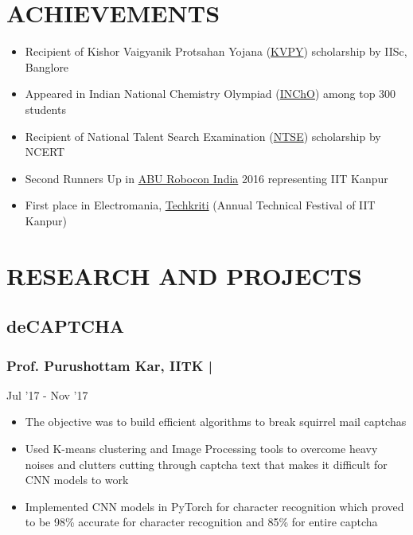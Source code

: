 \documentclass[letterpaper]{twentysecondcv} %
\begin{document}
\section{ACHIEVEMENTS}
\begin{itemize}
	\item Recipient of Kishor Vaigyanik Protsahan Yojana (\href{http://www.kvpy.iisc.ernet.in/main/index.htm}{KVPY}) scholarship by IISc, Banglore
	\item Appeared in Indian National Chemistry Olympiad (\href{http://chem.hbcse.tifr.res.in/in-india/}{INChO}) among top 300 students
	\item Recipient of National Talent Search Examination (\href{http://www.ncert.nic.in/programmes/talent_exam/index_talent.html}{NTSE}) scholarship by NCERT
	\item Second Runners Up in \href{http://www.roboconindia.com/}{ABU Robocon India} 2016 representing IIT Kanpur %
	\item First place in Electromania, \href{https://techkriti.org/}{Techkriti} (Annual Technical Festival of IIT Kanpur)
\end{itemize}
\section{RESEARCH AND PROJECTS}
\subsection{deCAPTCHA}\subsubsection{Prof. Purushottam Kar, IITK | } \hfill{} Jul '17 - Nov '17

\begin{itemize}
\item The objective was to build efficient algorithms to break squirrel mail captchas
\item Used K-means clustering and Image Processing tools to overcome heavy noises and clutters cutting through captcha text that makes it difficult for CNN models to work
\item Implemented CNN models in PyTorch for character recognition which proved to be 98\% accurate for character recognition and 85\% for entire captcha
\end{itemize}
\end{document}
